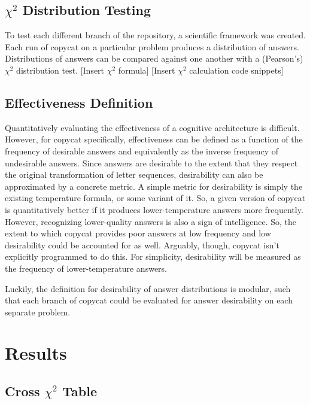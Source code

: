 \documentclass[a4paper]{article}
\begin{document}
    \subsection{$\chi^2$ Distribution Testing}

        To test each different branch of the repository, a scientific framework was created.
        Each run of copycat on a particular problem produces a distribution of answers.
        Distributions of answers can be compared against one another with a (Pearson's) $\chi^2$ distribution test.
        [Insert $\chi^2$ formula]
        [Insert $\chi^2$ calculation code snippets]

    \subsection{Effectiveness Definition}

        Quantitatively evaluating the effectiveness of a cognitive architecture is difficult.
        However, for copycat specifically, effectiveness can be defined as a function of the frequency of desirable answers and equivalently as the inverse frequency of undesirable answers.
        Since answers are desirable to the extent that they respect the original transformation of letter sequences, desirability can also be approximated by a concrete metric.
        A simple metric for desirability is simply the existing temperature formula, or some variant of it.
        So, a given version of copycat is quantitatively better if it produces lower-temperature answers more frequently.
        However, recognizing lower-quality answers is also a sign of intelligence.
        So, the extent to which copycat provides poor answers at low frequency and low desirability could be accounted for as well.
        Arguably, though, copycat isn't explicitly programmed to do this.
        For simplicity, desirability will be measured as the frequency of lower-temperature answers.

        Luckily, the definition for desirability of answer distributions is modular, such that each branch of copycat could be evaluated for answer desirability on each separate problem.
       
\section{Results}

    \subsection{Cross $\chi^2$ Table}
\end{document}
